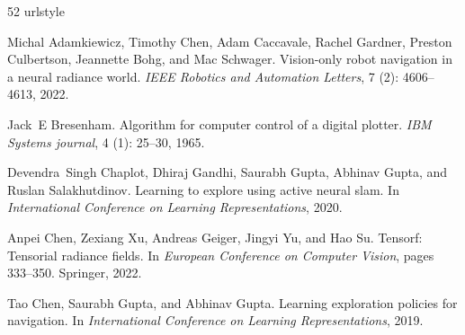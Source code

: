 \documentclass[10pt,twocolumn,letterpaper]{article}
\begin{document}
\vspace{-2cm}
\renewcommand{\thefootnote}{\fnsymbol{footnote}}












{
    \small
    
    \begin{thebibliography}{52}
\providecommand{\natexlab}[1]{#1}
\providecommand{\url}[1]{\texttt{#1}}
\expandafter\ifx\csname urlstyle\endcsname\relax
  \providecommand{\doi}[1]{doi: #1}\else
  \providecommand{\doi}{doi: \begingroup \urlstyle{rm}\Url}\fi

Michal Adamkiewicz, Timothy Chen, Adam Caccavale, Rachel Gardner, Preston Culbertson, Jeannette Bohg, and Mac Schwager.
\newblock Vision-only robot navigation in a neural radiance world.
\newblock \emph{IEEE Robotics and Automation Letters}, 7 (2): 4606--4613, 2022.

Jack~E Bresenham.
\newblock Algorithm for computer control of a digital plotter.
\newblock \emph{IBM Systems journal}, 4 (1): 25--30, 1965.

Devendra~Singh Chaplot, Dhiraj Gandhi, Saurabh Gupta, Abhinav Gupta, and Ruslan Salakhutdinov.
\newblock Learning to explore using active neural slam.
\newblock In \emph{International Conference on Learning Representations}, 2020.

Anpei Chen, Zexiang Xu, Andreas Geiger, Jingyi Yu, and Hao Su.
\newblock Tensorf: Tensorial radiance fields.
\newblock In \emph{European Conference on Computer Vision}, pages 333--350. Springer, 2022.

Tao Chen, Saurabh Gupta, and Abhinav Gupta.
\newblock Learning exploration policies for navigation.
\newblock In \emph{International Conference on Learning Representations}, 2019.


\end{thebibliography}}
\end{document}
